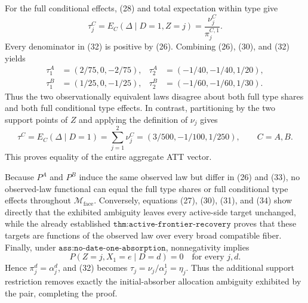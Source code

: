 For the full conditional effects, (28) and total expectation within type give
\[
\tau_j^C=E_C(\Delta\mid D=1,Z=j)
=\frac{\nu_j^C}{\pi_j^{C,1}}.                              \tag{32}
\]
Every denominator in (32) is positive by (26).  Combining (26), (30), and (32) yields
\[
\begin{aligned}
\tau_1^A&=(2/75,0,-2/75),&
\tau_2^A&=(-1/40,-1/40,1/20),\\
\tau_1^B&=(1/25,0,-1/25),&
\tau_2^B&=(-1/60,-1/60,1/30).
\end{aligned}                                                \tag{33}
\]
Thus the two observationally equivalent laws disagree about both full type shares and both full conditional type effects.  In contrast, partitioning by the two support points of \(Z\) and applying the definition of \(\nu_j\) gives
\[
\tau^C=E_C(\Delta\mid D=1)=\sum_{j=1}^2\nu_j^C
=(3/500,-1/100,1/250),
\qquad C=A,B.                                                \tag{34}
\]
This proves equality of the entire aggregate ATT vector.

Because \(P^A\) and \(P^B\) induce the same observed law but differ in (26) and (33), no observed-law functional can equal the full type shares or full conditional type effects throughout \(\mathcal M_{\mathrm{face}}\).  Conversely, equations (27), (30), (31), and (34) show directly that the exhibited ambiguity leaves every active-side target unchanged, while the already established \(\texttt{thm:active-frontier-recovery}\) proves that these targets are functions of the observed law over every broad compatible fiber.  Finally, under \(\texttt{ass:no-date-one-absorption}\), nonnegativity implies
\[
P(Z=j,X_1=e\mid D=d)=0
\quad\text{for every }j,d.
\]
Hence \(\pi_j^d=\alpha_j^d\), and (32) becomes \(\tau_j=\nu_j/\alpha_j^1=\eta_j\).  Thus the additional support restriction removes exactly the initial-absorber allocation ambiguity exhibited by the pair, completing the proof.
